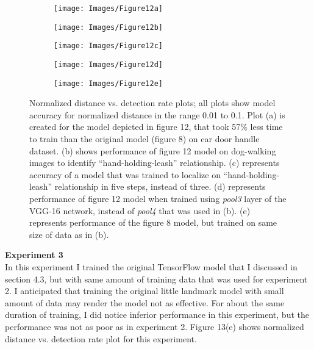 \documentclass [11pt,letterpaper ,twoside ,openany ]{report}
\begin{document}
    \begin{figure}[h!]
    \centering
        \begin{subfigure}[b]{.45\linewidth}
            \texttt{[image: Images/Figure12a]}
            \caption{}
        \end{subfigure}

        \begin{subfigure}[b]{.45\linewidth}
            \texttt{[image: Images/Figure12b]}
            \caption{}
        \end{subfigure}
        \begin{subfigure}[b]{.45\linewidth}
            \texttt{[image: Images/Figure12c]}
            \caption{}
        \end{subfigure}        

        \begin{subfigure}[b]{.45\linewidth}
            \texttt{[image: Images/Figure12d]}
            \caption{}
        \end{subfigure}
        \begin{subfigure}[b]{.45\linewidth}
            \texttt{[image: Images/Figure12e]}
            \caption{}
        \end{subfigure}                
        \caption{Normalized distance vs. detection rate plots; all plots show model accuracy for normalized distance in the range 0.01 to 0.1. Plot (a) is created for the model depicted in figure 12, that took 57\% less time to train than the original model (figure 8) on car door handle dataset. (b) shows performance of figure 12 model on dog-walking images to identify ``hand-holding-leash'' relationship. (c) represents accuracy of a model that was trained to localize on ``hand-holding-leash'' relationship in five steps, instead of three. (d) represents performance of figure 12 model when trained using \textit{pool3} layer of the VGG-16 network, instead of \textit{pool4} that was used in (b). (e) represents performance of the figure 8 model, but trained on same size of data as in (b).}
    \end{figure}   

    \noindent
    \textbf{Experiment 3}\\             
    In this experiment I trained the original TensorFlow model that I discussed in section 4.3, but with same amount of training data that was used for experiment 2. I anticipated that training the original little landmark model with small amount of data may render the model not as effective. For about the same duration of training, I did notice inferior performance in this experiment, but the performance was not as poor as in experiment 2. Figure 13(e) shows normalized distance vs. detection rate plot for this experiment. 
\end{document}
